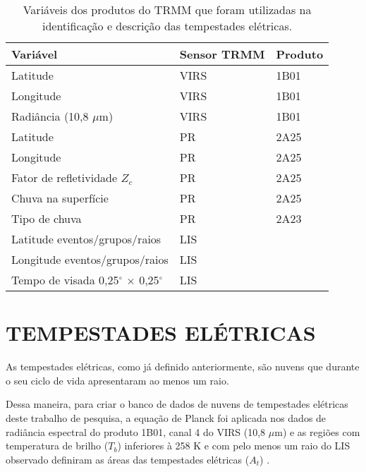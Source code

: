 \begin{table}[!h]
\centering
\small
\caption{Variáveis dos produtos do TRMM que foram utilizadas na identificação e descrição das tempestades elétricas.}
\label{varsTRMM}
\renewcommand {\tabularxcolumn }[1]{ >{\arraybackslash }m{#1}}
\begin{tabularx}{\textwidth}{ p{7cm} W W }
\hline
\hline
\textbf{Variável} & \textbf{Sensor TRMM} & \textbf{Produto} \\[1.5pt]
\hline
 Latitude & VIRS & 1B01 \\[1.5pt]
Longitude & VIRS & 1B01 \\[1.5pt]
 Radiância (10,8 $\mu$m) & VIRS & 1B01 \\[1.5pt]
Latitude & PR & 2A25 \\[1.5pt]
 Longitude & PR & 2A25 \\[1.5pt]
Fator de refletividade $Z_c$ & PR & 2A25 \\[1.5pt]
Chuva na superfície  & PR & 2A25 \\[1.5pt]
 Tipo de chuva  &  PR  & 2A23 \\[1.5pt]
Latitude eventos/grupos/raios & LIS &  \cite{rachel} \\[1.5pt]
 Longitude eventos/grupos/raios&LIS& \cite{rachel} \\[1.5pt]
Tempo de visada 0,25$^{\circ}$ $\times$ 0,25$^{\circ}$ & LIS &  \cite{rachel} \\

\hline
\end{tabularx} 
\end{table} 
 

\section{TEMPESTADES ELÉTRICAS}
\label{identificaTempestades}


As tempestades elétricas, como já definido anteriormente, são nuvens que durante o seu ciclo de vida apresentaram ao menos um raio.

Dessa maneira, para criar o banco de dados de nuvens de tempestades elétricas deste trabalho de pesquisa, a equação de Planck foi aplicada nos dados de radiância espectral do produto 1B01, canal 4 do VIRS (10,8 $\mu$m) e as regiões com temperatura de brilho ($T_b$) inferiores à 258 K e com pelo menos um raio do LIS observado definiram as áreas das tempestades elétricas ($A_t$) \cite{morales2003}.

